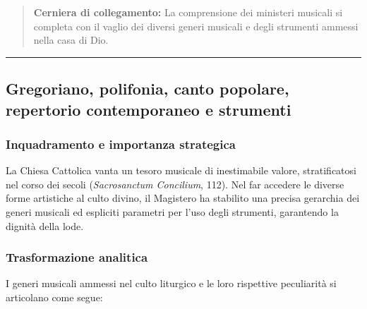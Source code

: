 \documentclass[12pt,a4paper]{article}
\begin{document}
	\begin{quote}
		\textbf{Cerniera di collegamento:} La comprensione dei ministeri musicali si completa con il vaglio dei diversi generi musicali e degli strumenti ammessi nella casa di Dio.
	\end{quote}
	
	\begin{center}\rule{0.5\linewidth}{0.5pt}\end{center}
	
	\subsection{Gregoriano, polifonia, canto popolare, repertorio contemporaneo e strumenti}\label{gregoriano-polifonia-canto-popolare-repertorio-contemporaneo-e-strumenti}
	
	\subsubsection{Inquadramento e importanza strategica}\label{inquadramento-e-importanza-strategica-8}
	
	La Chiesa Cattolica vanta un tesoro musicale di inestimabile valore, stratificatosi nel corso dei secoli (\emph{Sacrosanctum Concilium}, 112). Nel far accedere le diverse forme artistiche al culto divino, il Magistero ha stabilito una precisa gerarchia dei generi musicali ed espliciti parametri per l'uso degli strumenti, garantendo la dignità della lode.
	
	\subsubsection{Trasformazione analitica}\label{trasformazione-analitica-8}
	
	I generi musicali ammessi nel culto liturgico e le loro rispettive peculiarità si articolano come segue:
	
\end{document}
